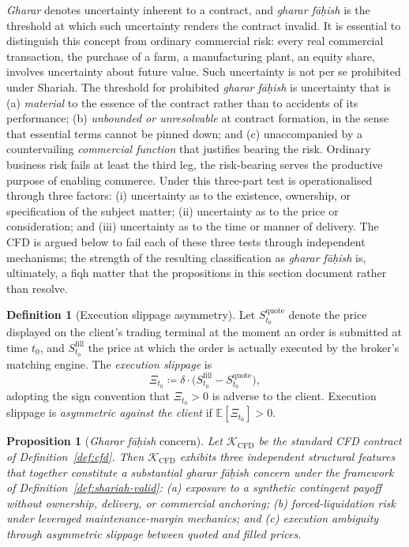 \documentclass[preprint,12pt,authoryear]{elsarticle}
\newcommand{\EE}{\mathbb{E}}
\newtheorem{proposition}{Proposition}[section]
\theoremstyle{definition}
\newtheorem{definition}{Definition}[section]
\begin{document}
\emph{Gharar} denotes uncertainty inherent to a contract, and
\emph{gharar f\={a}\d{h}ish} is the threshold at which such
uncertainty renders the contract invalid. It is essential to
distinguish this concept from ordinary commercial risk: every real
commercial transaction, the purchase of a farm, a manufacturing
plant, an equity share, involves uncertainty about future value.
Such uncertainty is not per se prohibited under Shariah. The
threshold for prohibited \emph{gharar f\={a}\d{h}ish} is
uncertainty that is (a) \emph{material} to the essence of the
contract rather than to accidents of its performance; (b)
\emph{unbounded or unresolvable} at contract formation, in the sense
that essential terms cannot be pinned down; and (c) unaccompanied by
a countervailing \emph{commercial function} that justifies bearing
the risk. Ordinary business risk fails at least the third leg,
the risk-bearing serves the productive purpose of enabling
commerce. Under \citet{Kamali2000} this three-part test is
operationalised through three factors: (i) uncertainty as to the
existence, ownership, or specification of the subject matter;
(ii) uncertainty as to the price or consideration; and
(iii) uncertainty as to the time or manner of delivery. The CFD is
argued below to fail each of these three tests through independent
mechanisms; the strength of the resulting classification as
\emph{gharar f\={a}\d{h}ish} is, ultimately, a fiqh matter that
the propositions in this section document rather than resolve.

\begin{definition}[Execution slippage asymmetry]
\label{def:slippage}
Let $S^{\text{quote}}_{t_0}$ denote the price displayed on the
client's trading terminal at the moment an order is submitted at
time $t_0$, and $S^{\text{fill}}_{t_0}$ the price at which the order
is actually executed by the broker's matching engine. The
\emph{execution slippage} is
\begin{equation}
    \Xi_{t_0} \coloneqq
    \delta \cdot \bigl( S^{\text{fill}}_{t_0}
                       - S^{\text{quote}}_{t_0} \bigr),
    \label{eq:slippage-def}
\end{equation}
adopting the sign convention that $\Xi_{t_0} > 0$ is adverse to the
client. Execution slippage is \emph{asymmetric against the client}
if $\EE[\Xi_{t_0}] > 0$.
\end{definition}

\begin{proposition}[\emph{Gharar f\={a}\d{h}ish} concern]
\label{prop:gharar}
Let $\mathcal{K}_{\text{CFD}}$ be the standard CFD contract of
Definition~\ref{def:cfd}. Then $\mathcal{K}_{\text{CFD}}$
exhibits three independent structural features that together
constitute a substantial \emph{gharar f\={a}\d{h}ish} concern
under the framework of Definition~\ref{def:shariah-valid}:
(a) exposure to a synthetic contingent payoff without ownership,
delivery, or commercial anchoring;
(b) forced-liquidation risk under leveraged maintenance-margin
mechanics; and
(c) execution ambiguity through asymmetric slippage between
quoted and filled prices.
\end{proposition}
\end{document}
